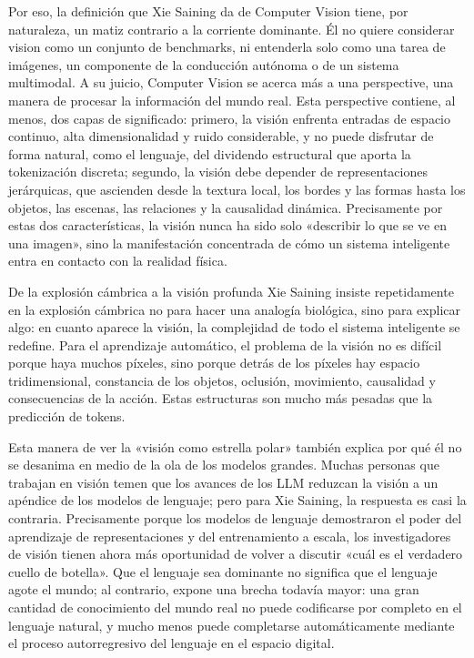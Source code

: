 \documentclass[a4paper,12pt]{article}
\begin{document}
Por eso, la definición que Xie Saining da de Computer Vision tiene, por naturaleza, un matiz contrario a la corriente dominante. Él no quiere considerar vision como un conjunto de benchmarks, ni entenderla solo como una tarea de imágenes, un componente de la conducción autónoma o de un sistema multimodal. A su juicio, Computer Vision se acerca más a una perspective, una manera de procesar la información del mundo real. Esta perspective contiene, al menos, dos capas de significado: primero, la visión enfrenta entradas de espacio continuo, alta dimensionalidad y ruido considerable, y no puede disfrutar de forma natural, como el lenguaje, del dividendo estructural que aporta la tokenización discreta; segundo, la visión debe depender de representaciones jerárquicas, que ascienden desde la textura local, los bordes y las formas hasta los objetos, las escenas, las relaciones y la causalidad dinámica. Precisamente por estas dos características, la visión nunca ha sido solo «describir lo que se ve en una imagen», sino la manifestación concentrada de cómo un sistema inteligente entra en contacto con la realidad física.

\begin{knowledgebox}{De la explosión cámbrica a la visión profunda}
Xie Saining insiste repetidamente en la explosión cámbrica no para hacer una analogía biológica, sino para explicar algo: en cuanto aparece la visión, la complejidad de todo el sistema inteligente se redefine. Para el aprendizaje automático, el problema de la visión no es difícil porque haya muchos píxeles, sino porque detrás de los píxeles hay espacio tridimensional, constancia de los objetos, oclusión, movimiento, causalidad y consecuencias de la acción. Estas estructuras son mucho más pesadas que la predicción de tokens.
\end{knowledgebox}

Esta manera de ver la «visión como estrella polar» también explica por qué él no se desanima en medio de la ola de los modelos grandes. Muchas personas que trabajan en visión temen que los avances de los LLM reduzcan la visión a un apéndice de los modelos de lenguaje; pero para Xie Saining, la respuesta es casi la contraria. Precisamente porque los modelos de lenguaje demostraron el poder del aprendizaje de representaciones y del entrenamiento a escala, los investigadores de visión tienen ahora más oportunidad de volver a discutir «cuál es el verdadero cuello de botella». Que el lenguaje sea dominante no significa que el lenguaje agote el mundo; al contrario, expone una brecha todavía mayor: una gran cantidad de conocimiento del mundo real no puede codificarse por completo en el lenguaje natural, y mucho menos puede completarse automáticamente mediante el proceso autorregresivo del lenguaje en el espacio digital.
\end{document}
